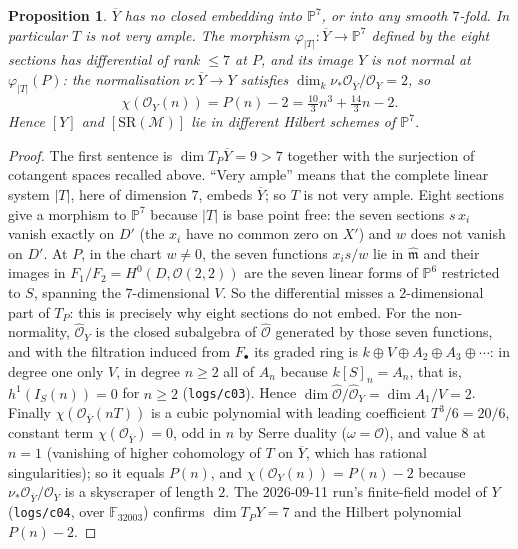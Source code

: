 \documentclass[10pt,a4paper]{article}
\theoremstyle{plain}
\newtheorem{proposition}[theorem]{Proposition}
\theoremstyle{definition}
\theoremstyle{remark}
\begin{document}
\begin{proposition}\label{prop:noembed}
$\overline{Y}$ has no closed embedding into $\mathbb{P}^7$, or into
any smooth $7$-fold. In particular $T$ is not very ample. The
morphism $\varphi_{|T|}:\overline{Y}\to\mathbb{P}^7$ defined by the
eight sections has differential of rank $\le 7$ at $P$, and its
image $Y$ is not normal at $\varphi_{|T|}(P)$: the normalisation
$\nu:\overline{Y}\to Y$ satisfies
$\dim_k\nu_*\mathcal{O}_{\overline{Y}}/\mathcal{O}_Y=2$, so
$$
\chi(\mathcal{O}_Y(n))=P(n)-2=\tfrac{10}{3}n^3+\tfrac{14}{3}n-2 .
$$
Hence $[Y]$ and $[\mathrm{SR}(\mathcal{M})]$ lie in different
Hilbert schemes of $\mathbb{P}^7$.
\end{proposition}

\begin{proof}
The first sentence is $\dim T_P\overline{Y}=9>7$ together with the
surjection of cotangent spaces recalled above. ``Very ample'' means
that the complete linear system $|T|$, here of dimension $7$,
embeds $\overline{Y}$; so $T$ is not very ample. Eight sections
give a morphism to $\mathbb{P}^7$ because $|T|$ is base point free:
the seven sections $s\,x_i$ vanish exactly on $D'$ (the $x_i$ have
no common zero on $X'$) and $w$ does not vanish on $D'$. At $P$,
in the chart $w\ne 0$, the seven functions $x_i s/w$ lie in
$\widehat{\mathfrak{m}}$ and their images in
$F_1/F_2=H^0(D,\mathcal{O}(2,2))$ are the seven linear forms of
$\mathbb{P}^6$ restricted to $S$, spanning the $7$-dimensional
$V$. So the differential misses a $2$-dimensional part of $T_P$:
this is precisely why eight sections do not embed. For the
non-normality, $\widehat{\mathcal{O}}_Y$ is the closed subalgebra
of $\widehat{\mathcal{O}}$ generated by those seven functions, and
with the filtration induced from $F_\bullet$ its graded ring is
$k\oplus V\oplus A_2\oplus A_3\oplus\cdots$: in degree one only $V$,
in degree $n\ge 2$ all of $A_n$ because $k[S]_n=A_n$, that is,
$h^1(I_S(n))=0$ for $n\ge 2$ (\texttt{logs/c03}). Hence
$\dim\widehat{\mathcal{O}}/\widehat{\mathcal{O}}_Y=\dim A_1/V=2$.
Finally $\chi(\mathcal{O}_{\overline{Y}}(nT))$ is a cubic
polynomial with leading coefficient $T^3/6=20/6$, constant term
$\chi(\mathcal{O}_{\overline{Y}})=0$, odd in $n$ by Serre duality
($\omega=\mathcal{O}$), and value $8$ at $n=1$ (vanishing of higher
cohomology of $T$ on $\overline{Y}$, which has rational
singularities); so it equals $P(n)$, and
$\chi(\mathcal{O}_Y(n))=P(n)-2$ because
$\nu_*\mathcal{O}_{\overline{Y}}/\mathcal{O}_Y$ is a skyscraper of
length $2$. The 2026-09-11 run's finite-field model of $Y$
(\texttt{logs/c04}, over $\mathbb{F}_{32003}$) confirms
$\dim T_PY=7$ and the Hilbert polynomial $P(n)-2$.
\end{proof}
\end{document}
